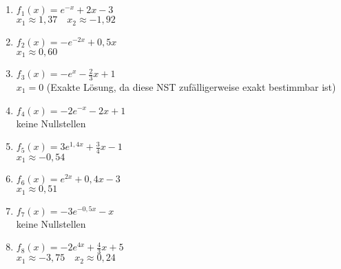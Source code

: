 \begin{minipage}{\textwidth}
	\begin{Exercise}[title={Prüfe an Hand deiner Skizze, ob die Funktionen aus Aufg. \ref{schAsyA1} NST haben und bestimme diese auf 2 Nachkommastellen genau.}, label=NSTnaeherungA1]\\
	\end{Exercise}
\end{minipage}

\begin{Answer}[ref=NSTnaeherungA1]\\
	\begin{minipage}{\textwidth}
		\begin{minipage}{0.49\textwidth}
			\begin{enumerate}[label=\alph*)]
				\item \(f_1(x)=e^{-x}+2x-3\)\\
				\(x_1\approx 1,37\quad x_2\approx -1,92\)
				\item \(f_2(x)=-e^{-2x}+0,5x\)\\
				\(x_1\approx 0,60\)
				\item \(f_3(x)=-e^{x}-\frac{2}{3}x+1\)\\
				\(x_1=0\) (Exakte Lösung, da diese NST zufälligerweise exakt bestimmbar ist)
				\item \(f_4(x)=-2e^{-x}-2x+1\)\\
				keine Nullstellen
			\end{enumerate}
		\end{minipage}
		\begin{minipage}{0.49\textwidth}
			\begin{enumerate}[label=\alph*)]
				\setcounter{enumi}{4}
				\item \(f_5(x)=3e^{1,4x}+\frac{3}{4}x-1\)\\
				\(x_1\approx -0,54\)
				\item \(f_6(x)=e^{2x}+0,4x-3\)\\
				\(x_1\approx 0,51\)
				\item \(f_7(x)=-3e^{-0,5x}-x\)\\
				keine Nullstellen
				\item \(f_8(x)=-2e^{4x}+\frac{4}{3}x+5\)\\
				\(x_1\approx -3,75\quad x_2\approx 0,24\)
			\end{enumerate}
		\end{minipage}
	\end{minipage}
\end{Answer}